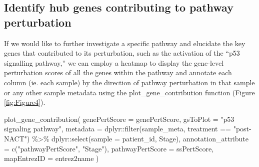 \documentclass[9pt,a4paper,]{extarticle}
\newenvironment{Shaded}{\begin{snugshade}}{\end{snugshade}}
\newcommand{\AttributeTok}[1]{\textcolor[rgb]{0.77,0.63,0.00}{#1}}
\newcommand{\FunctionTok}[1]{\textcolor[rgb]{0.00,0.00,0.00}{#1}}
\newcommand{\NormalTok}[1]{#1}
\newcommand{\SpecialCharTok}[1]{\textcolor[rgb]{0.00,0.00,0.00}{#1}}
\newcommand{\StringTok}[1]{\textcolor[rgb]{0.31,0.60,0.02}{#1}}
\begin{document}
\hypertarget{identify-hub-genes-contributing-to-pathway-perturbation}{%
\subsection{Identify hub genes contributing to pathway perturbation}\label{identify-hub-genes-contributing-to-pathway-perturbation}}

If we would like to further investigate a specific pathway and elucidate the key genes that contributed to its perturbation, such as the activation of the ``p53 signalling pathway,'' we can employ a heatmap to display the gene-level perturbation scores of all the genes within the pathway and annotate each column (ie. each sample) by the direction of pathway perturbation in that sample or any other sample metadata using the plot\_gene\_contribution function (Figure \ref{fig:Figure4}).

\begin{Shaded}
\begin{Highlighting}[]
\FunctionTok{plot\_gene\_contribution}\NormalTok{(}
    \AttributeTok{genePertScore =}\NormalTok{ genePertScore, }
    \AttributeTok{gsToPlot =} \StringTok{"p53 signaling pathway"}\NormalTok{, }
    \AttributeTok{metadata =}\NormalTok{ dplyr}\SpecialCharTok{::}\FunctionTok{filter}\NormalTok{(sample\_meta, treatment }\SpecialCharTok{==} \StringTok{"post{-}NACT"}\NormalTok{) }\SpecialCharTok{\%\textgreater{}\%}
\NormalTok{        dplyr}\SpecialCharTok{::}\FunctionTok{select}\NormalTok{(}\AttributeTok{sample =}\NormalTok{ patient\_id, Stage), }
    \AttributeTok{annotation\_attribute =} \FunctionTok{c}\NormalTok{(}\StringTok{"pathwayPertScore"}\NormalTok{, }\StringTok{"Stage"}\NormalTok{), }
    \AttributeTok{pathwayPertScore =}\NormalTok{ ssPertScore, }
    \AttributeTok{mapEntrezID =}\NormalTok{ entrez2name}
\NormalTok{)}
\end{Highlighting}
\end{Shaded}
\end{document}
